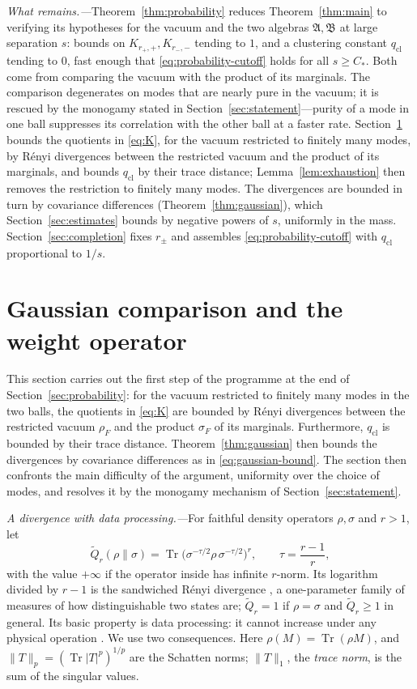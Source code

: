 \documentclass[aps,prl,reprint,longbibliography,raggedbottom]{revtex4-2}
\newcommand{\norm}[1]{\lVert #1\rVert}
\newcommand{\abs}[1]{\lvert #1\rvert}
\DeclareMathOperator{\Tr}{Tr}
\newcommand{\A}{\mathfrak A}
\newcommand{\B}{\mathfrak B}
\newcommand{\Qtil}{\widetilde Q}
\begin{document}
\emph{What remains.---}Theorem~\ref{thm:probability} reduces
Theorem~\ref{thm:main} to verifying its hypotheses for the vacuum and
the two algebras $\A,\B$ at large separation $s$: bounds on
$K_{r_+,+},K_{r_-,-}$ tending to $1$, and a clustering constant
$q_{\mathrm{cl}}$ tending to $0$, fast enough that
\eqref{eq:probability-cutoff} holds for all $s\ge C_*$. Both come from
comparing the vacuum with the product of its marginals.
The comparison degenerates on modes that are nearly pure in the
vacuum; it is rescued by the monogamy stated in
Section~\ref{sec:statement}---purity of a mode in one ball suppresses
its correlation with the other ball at a faster rate.
Section~\ref{sec:gaussian} bounds the quotients in \eqref{eq:K}, for
the vacuum restricted to finitely many modes, by R\'enyi divergences
between the restricted vacuum and the product of its marginals, and
bounds $q_{\mathrm{cl}}$ by their trace distance;
Lemma~\ref{lem:exhaustion} then removes the restriction to finitely
many modes. The divergences are bounded in turn by covariance
differences (Theorem~\ref{thm:gaussian}), which
Section~\ref{sec:estimates} bounds by negative powers of $s$,
uniformly in the mass. Section~\ref{sec:completion} fixes $r_\pm$ and
assembles \eqref{eq:probability-cutoff} with $q_{\mathrm{cl}}$
proportional to $1/s$.

\section{Gaussian comparison and the weight operator}
\label{sec:gaussian}

This section carries out the first step of the programme at the end of
Section~\ref{sec:probability}: for the vacuum restricted to finitely
many modes in the two balls, the quotients in \eqref{eq:K} are bounded
by R\'enyi divergences between the restricted vacuum $\rho_F$ and the
product $\sigma_F$ of its marginals. Furthermore, $q_{\mathrm{cl}}$ is bounded by their
trace distance. Theorem~\ref{thm:gaussian} then bounds the divergences
by covariance differences as in \eqref{eq:gaussian-bound}.
The section then confronts the main difficulty of the argument,
uniformity over the choice of modes, and resolves it by the monogamy
mechanism of Section~\ref{sec:statement}.


\emph{A divergence with data processing.---}For faithful density
operators $\rho,\sigma$ and $r>1$, let
\begin{equation}
\Qtil_r(\rho\|\sigma)=\Tr\bigl(\sigma^{-\tau/2}\rho\,\sigma^{-\tau/2}\bigr)^r,
\qquad\tau=\frac{r-1}r,
\label{eq:renyi}
\end{equation}
with the value $+\infty$ if the operator inside has infinite $r$-norm.
Its logarithm divided by $r-1$ is the sandwiched R\'enyi divergence
\cite{WWY14,ML13}, a one-parameter family of measures of how
distinguishable two states are; $\Qtil_r=1$ if $\rho=\sigma$ and
$\Qtil_r\ge1$ in general. Its basic property is data processing: it
cannot increase under any physical operation \cite{FL13,Beigi13}. We
use two consequences. Here $\rho(M)=\Tr(\rho M)$, and
$\norm T_p=(\Tr\abs T^p)^{1/p}$ are the Schatten norms; $\norm T_1$,
the \emph{trace norm}, is the sum of the singular values.
\end{document}
